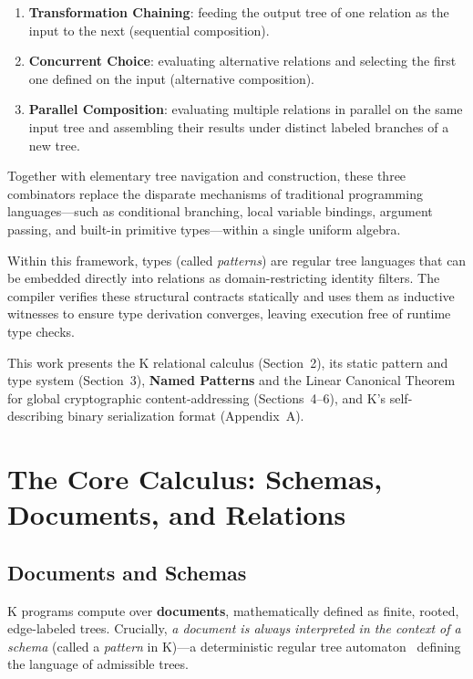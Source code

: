 \documentclass[11pt,a4paper]{article}
\begin{document}
\begin{enumerate}
  \item \textbf{Transformation Chaining}: feeding the output tree of one relation as the input to the next (sequential composition).
  \item \textbf{Concurrent Choice}: evaluating alternative relations and selecting the first one defined on the input (alternative composition).
  \item \textbf{Parallel Composition}: evaluating multiple relations in parallel on the same input tree and assembling their results under distinct labeled branches of a new tree.
\end{enumerate}

Together with elementary tree navigation and construction, these three combinators replace the disparate mechanisms of traditional programming languages---such as conditional branching, local variable bindings, argument passing, and built-in primitive types---within a single uniform algebra.

Within this framework, types (called \emph{patterns}) are regular tree languages that can be embedded directly into relations as domain-restricting identity filters. The compiler verifies these structural contracts statically and uses them as inductive witnesses to ensure type derivation converges, leaving execution free of runtime type checks.

This work presents the K relational calculus (Section~2), its static pattern and type system (Section~3), \textbf{Named Patterns} and the Linear Canonical Theorem for global cryptographic content-addressing (Sections~4--6), and K's self-describing binary serialization format (Appendix~A).

\section{The Core Calculus: Schemas, Documents, and Relations}

\subsection{Documents and Schemas}

K programs compute over \textbf{documents}, mathematically defined as finite, rooted, edge-labeled trees. Crucially, \emph{a document is always interpreted in the context of a schema} (called a \emph{pattern} in K)---a deterministic regular tree automaton~\cite{comon2007tree} defining the language of admissible trees.
\end{document}

